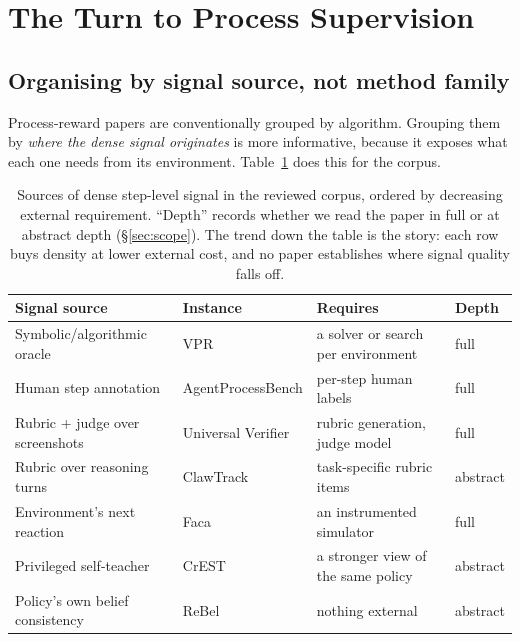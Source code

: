 \documentclass[10pt,twocolumn,a4paper]{article}
\begin{document}
\section{The Turn to Process Supervision}
\label{sec:process}

\subsection{Organising by signal source, not method family}

Process-reward papers are conventionally grouped by algorithm.
Grouping them by \emph{where the dense signal originates} is more informative, because it
exposes what each one needs from its environment.
Table~\ref{tab:sources} does this for the corpus.

\begin{table}[t]
\centering
\begin{tabular}{@{}p{4.1cm}p{3.6cm}p{5.6cm}l@{}}
\toprule
Signal source & Instance & Requires & Depth \\
\midrule
Symbolic/algorithmic oracle & VPR \citep{yuan2026verifiableprocessrewardsagentic}
  & a solver or search per environment & full \\
Human step annotation & AgentProcessBench \citep{fan2026agentprocessbenchdiagnosingsteplevelprocess}
  & per-step human labels & full \\
Rubric + judge over screenshots & Universal Verifier \citep{rosset2026artbuildingverifierscomputer}
  & rubric generation, judge model & full \\
Rubric over reasoning turns & ClawTrack \citep{wu2026clawtracktracelevelevaluationimprovement}
  & task-specific rubric items & abstract \\
Environment's next reaction & Faca \citep{zhao2026betteragentsmultiturnuser}
  & an instrumented simulator & full \\
Privileged self-teacher & CrEST \citep{wang2026teachmagnitudedirectionverifierbounded}
  & a stronger view of the same policy & abstract \\
Policy's own belief consistency & ReBel \citep{tang2026rewardingbeliefsactionsconsistencyguided}
  & nothing external & abstract \\
\bottomrule
\end{tabular}
\caption{Sources of dense step-level signal in the reviewed corpus, ordered by decreasing
external requirement.
``Depth'' records whether we read the paper in full or at abstract depth
(\S\ref{sec:scope}).
The trend down the table is the story: each row buys density at lower external cost, and
no paper establishes where signal quality falls off.}
\label{tab:sources}
\end{table}
\end{document}
